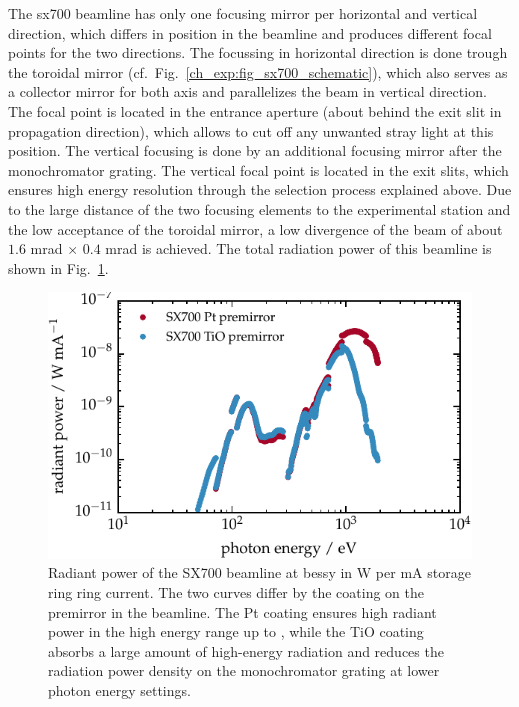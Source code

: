 The \gls{sx700} beamline has only one focusing mirror per horizontal and vertical direction, which differs in position in the beamline and produces different focal points for the two directions. The focussing in horizontal direction is done trough the toroidal mirror (cf.~Fig.~\ref{ch_exp:fig_sx700_schematic}), which also serves as a collector mirror for both axis and parallelizes the beam in vertical direction. The focal point is located in the entrance aperture (about  behind the exit slit in propagation direction), which allows to cut off any unwanted stray light at this position. The vertical focusing is done by an additional focusing mirror after the monochromator grating. The vertical focal point is located in the exit slits, which ensures high energy resolution through the selection process explained above. Due to the large distance of the two focusing elements to the experimental station and the low acceptance of the toroidal mirror, a low divergence of the beam of about $1.6$ mrad $\times$ $0.4$ mrad is achieved. The total radiation power of this beamline is shown in Fig.~\ref{ch_exp:fig_flux_sx700}.
\begin{figure}[htb]
    \includegraphics{img/beamline_radiant_power.pdf}
    \caption[Radiant power of the SX700 beamline.]{Radiant power of the SX700 beamline at \gls{bessy} in W per mA storage ring ring current. The two curves differ by the coating on the premirror in the beamline. The Pt coating ensures high radiant power in the high energy range up to , while the TiO coating absorbs a large amount of high-energy radiation and reduces the radiation power density on the monochromator grating at lower photon energy settings.}
    \label{ch_exp:fig_flux_sx700}
\end{figure}

